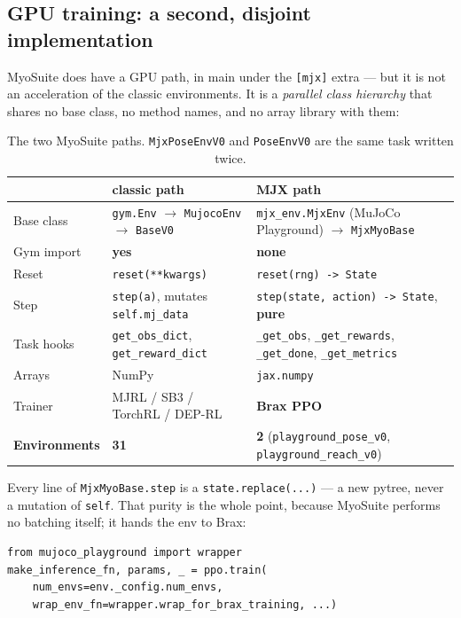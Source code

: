 \documentclass[11pt,a4paper]{article}
\newcommand{\yes}{\textbf{yes}}
\begin{document}
\subsection{GPU training: a second, disjoint implementation}

MyoSuite does have a GPU path, in main under the \texttt{[mjx]} extra --- but it is not an
acceleration of the classic environments. It is a \emph{parallel class hierarchy} that
shares no base class, no method names, and no array library with them:

\begin{table}[h!]
\centering
\footnotesize
\begin{tabular}{@{}L{3.0cm}L{4.6cm}L{4.8cm}@{}}
\toprule
 & classic path & MJX path \\
\midrule
Base class   & \texttt{gym.Env} $\to$ \texttt{MujocoEnv} $\to$ \texttt{BaseV0} & \texttt{mjx\_env.MjxEnv} (MuJoCo Playground) $\to$ \texttt{MjxMyoBase} \\
Gym import   & \yes & \textbf{none} \\
Reset        & \texttt{reset(**kwargs)} & \texttt{reset(rng) -> State} \\
Step         & \texttt{step(a)}, mutates \texttt{self.mj\_data} & \texttt{step(state, action) -> State}, \textbf{pure} \\
Task hooks   & \texttt{get\_obs\_dict}, \texttt{get\_reward\_dict} & \texttt{\_get\_obs}, \texttt{\_get\_rewards}, \texttt{\_get\_done}, \texttt{\_get\_metrics} \\
Arrays       & NumPy & \texttt{jax.numpy} \\
Trainer      & MJRL / SB3 / TorchRL / DEP-RL & \textbf{Brax PPO} \\
\textbf{Environments} & \textbf{31} & \textbf{2} (\texttt{playground\_pose\_v0}, \texttt{playground\_reach\_v0}) \\
\bottomrule
\end{tabular}
\caption{The two MyoSuite paths. \texttt{MjxPoseEnvV0} and \texttt{PoseEnvV0} are the same
task written twice.}
\end{table}

\noindent
Every line of \texttt{MjxMyoBase.step} is a \texttt{state.replace(...)} --- a new pytree,
never a mutation of \texttt{self}. That purity is the whole point, because MyoSuite performs
no batching itself; it hands the env to Brax:

\begin{lstlisting}
from mujoco_playground import wrapper
make_inference_fn, params, _ = ppo.train(
    num_envs=env._config.num_envs,
    wrap_env_fn=wrapper.wrap_for_brax_training, ...)
\end{lstlisting}
\end{document}
